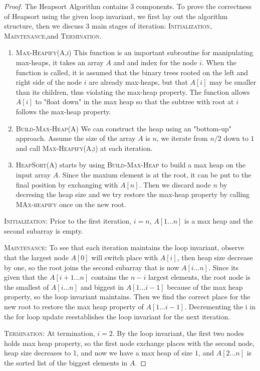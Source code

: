 \documentclass[12pt]{article}
\begin{document}
\begin{proof}
The Heapsort Algorithm contains $3$ components. To prove the correctness of Heapsort using the given loop invariant, we first lay out the algorithm structure, then we discuss $3$ main stages of iteration: \textsc{Initialization},
\textsc{Maintenance},and \textsc{Termination}. 
\begin{enumerate}
  
    \item \textsc{Max-Heapify(A,i)}
    This function is an important subroutine for manipulating max-heaps, it takes an array $A$ and and index for the node $i$. When the function is called, it is assumed that the binary trees rooted on the left and right side of the node $i$ are already max-heaps, but that $A[i]$ may be smaller than its children, thus violating the max-heap property. The function allows $A[i]$ to "float down" in the max heap so that the subtree with root at $i$ follows the max-heap property.
    \item \textsc{Build-Max-Heap(A)} 
    We can construct the heap using an "bottom-up" approach. Assume the size of the array $A$ is $n$, we iterate from $n/2$ down to  $1$ and call \textsc{Max-Heapify(A,i)} at each iteration. 
    \item \textsc{HeapSort(A)} starts by using \textsc{Build-Max-Heap} to build a max heap on the input array $A$. Since the maxium element is at the root, it can be put to the final position by exchanging with $A[n]$. Then we discard node $n$ by decresing the heap size and we try restore the max-heap property by calling \textsc{MAx-heapify} once on the new root.
\end{enumerate}



\textsc{Initialization}:  Prior to the first iteration, $i = n$, $A[1...n]$ is a max heap and the second subarray is empty. 

\textsc{Maintenance}: To see that each iteration maintains the loop invariant, observe that the largest node $A[0]$ will switch place with $A[i]$, then heap size decrease by one, so the root joins the second subarray that is now $A[i...n]$. Since its given that the $A[i+1...n]$ contains the $n-i$ largest elements,  the root node is the smallest of $A[i...n]$ and biggest in $A[1...i-1]$ because of the max heap property, so the loop invariant maintains. Then we find the correct place for the new root to restore the max heap property of $A[1...i-1]$. Decrementing the i in the for loop update reestablishes the loop invariant for the next iteration. 

\textsc{Termination}: At termination, $i = 2$. By the loop invariant, the first two nodes holds max heap property, so the first node exchange places with the second node, heap size decreases to 1, and now we have a max heap of size $1$, and $A[2...n]$ is the sorted list of the biggest elements in $A$. 

\end{proof}
\end{document}

